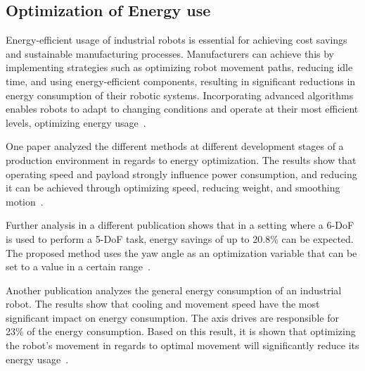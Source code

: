\subsection{Optimization of Energy use}
Energy-efficient usage of industrial robots is essential for achieving cost savings and sustainable manufacturing processes. Manufacturers can achieve this by implementing strategies such as optimizing robot movement paths, reducing idle time, and using energy-efficient components, resulting in significant reductions in energy consumption of their robotic systems. Incorporating advanced algorithms enables robots to adapt to changing conditions and operate at their most efficient levels, optimizing energy usage~\cite{Uhlmann.2016}. 

One paper analyzed the different methods at different development stages of a production environment in regards to energy optimization. The results show that operating speed and payload strongly influence power consumption, and reducing it can be achieved through optimizing speed, reducing weight, and smoothing motion~\cite{Paryanto.2015}.

Further analysis in a different publication shows that in a setting where a 6-\acrshort{DoF} is used to perform a 5-\acrshort{DoF} task, energy savings of up to 20.8\% can be expected. The proposed method uses the yaw angle as an optimization variable that can be set to a value in a certain range~\cite{Boscariol.2020}. 

Another publication analyzes the general energy consumption of an industrial robot. The results show that cooling and movement speed have the most significant impact on energy consumption. The axis drives are responsible for 23\% of the energy consumption. Based on this result, it is shown that optimizing the robot's movement in regards to optimal movement will significantly reduce its energy usage~\cite{Uhlmann.2016}. 




